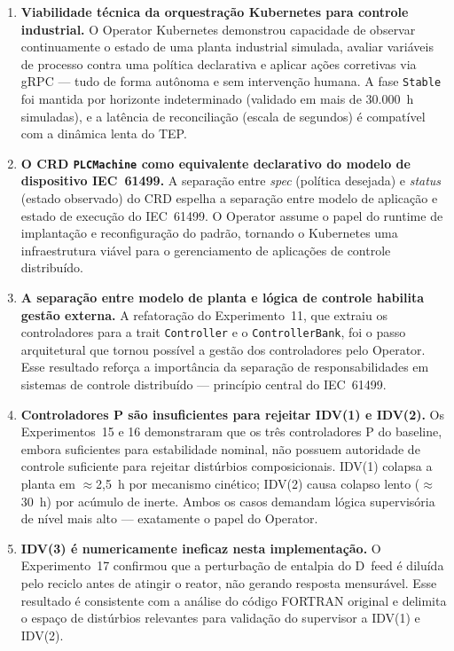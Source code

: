 \begin{enumerate}

  \item \textbf{Viabilidade técnica da orquestração Kubernetes para controle industrial.}
  O Operator Kubernetes demonstrou capacidade de observar continuamente o estado de uma planta industrial simulada, avaliar variáveis de processo contra uma política declarativa e aplicar ações corretivas via gRPC — tudo de forma autônoma e sem intervenção humana. A fase \texttt{Stable} foi mantida por horizonte indeterminado (validado em mais de 30.000~h simuladas), e a latência de reconciliação (escala de segundos) é compatível com a dinâmica lenta do TEP.

  \item \textbf{O CRD \texttt{PLCMachine} como equivalente declarativo do modelo de dispositivo IEC~61499.}
  A separação entre \textit{spec} (política desejada) e \textit{status} (estado observado) do CRD espelha a separação entre modelo de aplicação e estado de execução do IEC~61499. O Operator assume o papel do runtime de implantação e reconfiguração do padrão, tornando o Kubernetes uma infraestrutura viável para o gerenciamento de aplicações de controle distribuído.

  \item \textbf{A separação entre modelo de planta e lógica de controle habilita gestão externa.}
  A refatoração do Experimento~11, que extraiu os controladores para a trait \texttt{Controller} e o \texttt{ControllerBank}, foi o passo arquitetural que tornou possível a gestão dos controladores pelo Operator. Esse resultado reforça a importância da separação de responsabilidades em sistemas de controle distribuído — princípio central do IEC~61499.

  \item \textbf{Controladores P são insuficientes para rejeitar IDV(1) e IDV(2).}
  Os Experimentos~15 e 16 demonstraram que os três controladores P do baseline, embora suficientes para estabilidade nominal, não possuem autoridade de controle suficiente para rejeitar distúrbios composicionais. IDV(1) colapsa a planta em $\approx$2,5~h por mecanismo cinético; IDV(2) causa colapso lento ($\approx$30~h) por acúmulo de inerte. Ambos os casos demandam lógica supervisória de nível mais alto — exatamente o papel do Operator.

  \item \textbf{IDV(3) é numericamente ineficaz nesta implementação.}
  O Experimento~17 confirmou que a perturbação de entalpia do D~feed é diluída pelo reciclo antes de atingir o reator, não gerando resposta mensurável. Esse resultado é consistente com a análise do código FORTRAN original e delimita o espaço de distúrbios relevantes para validação do supervisor a IDV(1) e IDV(2).


\end{enumerate}
